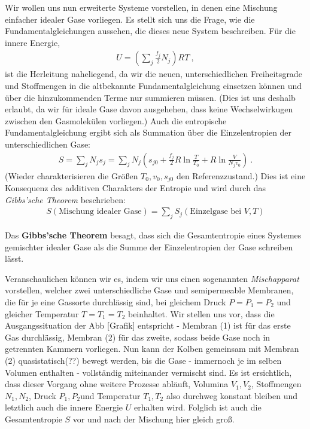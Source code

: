 Wir wollen uns nun erweiterte Systeme vorstellen, in denen eine Mischung einfacher idealer Gase vorliegen. Es stellt sich uns die Frage, wie die Fundamentalgleichungen aussehen, die dieses neue System beschreiben. Für die innere Energie, 
\begin{align*}
    \boxed{U=\left(\sum_j\frac{f_j}{2}N_j\right)RT}\:,
\end{align*}
ist die Herleitung naheliegend, da wir die neuen, unterschiedlichen Freiheitsgrade und Stoffmengen in die altbekannte Fundamentalgleichung einsetzen können und über die hinzukommenden Terme nur summieren müssen. (Dies ist uns deshalb erlaubt, da wir für ideale Gase davon ausgehehen, dass keine Wechselwirkugen zwischen den Gasmolekülen vorliegen.) Auch die entropische Fundamentalgleichung ergibt sich als Summation über die Einzelentropien der unterschiedlichen Gase: 
\begin{align*}
    \boxed{S=\sum_jN_js_j=\sum_jN_j\left(s_{j0}+\frac{f_j}{2}R\ln\frac{T}{T_0}+R\ln\frac{V}{N_jv_0}\right)}\:.
\end{align*}
(Wieder charakterisieren die Größen $T_0,v_0,s_{j0}$ den Referenzzustand.) 
Dies ist eine Konsequenz des additiven Charakters der Entropie und wird durch das \emph{Gibbs’sche Theorem} beschrieben: 
\begin{align*}
    \boxed{S(\text{Mischung idealer Gase})=\sum_jS_j(\text{Einzelgase bei } V,T)}
\end{align*}
\begin{formal}
    Das \textbf{Gibbs'sche Theorem} besagt, dass sich die Gesamtentropie eines Systemes gemischter idealer Gase als die Summe der Einzelentropien der Gase schreiben lässt.
\end{formal}
Veranschaulichen können wir es, indem wir uns einen sogenannten \emph{Mischapparat} vorstellen, welcher zwei unterschiedliche Gase und semipermeable Membranen, die für je eine Gassorte durchlässig sind, bei gleichem Druck $P=P_1=P_2$ und gleicher Temperatur $T=T_1=T_2$ beinhaltet. Wir stellen uns vor, dass die Ausgangssituation der Abb [Grafik] entspricht - Membran (1) ist für das erste Gas durchlässig, Membran (2) für das zweite, sodass beide Gase noch in getrennten Kammern vorliegen. Nun kann der Kolben gemeinsam mit 
Membran (2) quasistatisch(??) bewegt werden, bis die Gase - immernoch je im selben Volumen enthalten - vollständig miteinander vermischt sind. Es ist ersichtlich, dass dieser Vorgang ohne weitere Prozesse abläuft, Volumina $V_1,V_2$, Stoffmengen $N_1,N_2$, Druck $P_1,P_2$und Temperatur $T_1,T_2$ also durchweg konstant bleiben und letztlich auch die innere Energie $U$ erhalten wird. Folglich ist auch die Gesamtentropie $S$ vor und nach der Mischung hier gleich groß.
